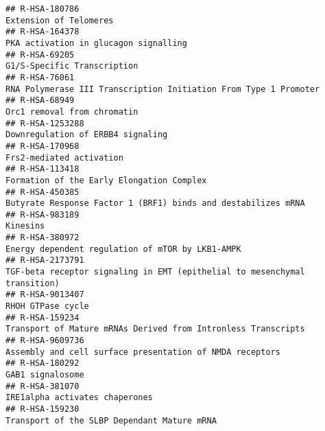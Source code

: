 \documentclass[
]{article}
\begin{document}
\begin{verbatim}
## R-HSA-180786                                                                                                                Extension of Telomeres
## R-HSA-164378                                                                                                 PKA activation in glucagon signalling
## R-HSA-69205                                                                                                            G1/S-Specific Transcription
## R-HSA-76061                                                                       RNA Polymerase III Transcription Initiation From Type 1 Promoter
## R-HSA-68949                                                                                                            Orc1 removal from chromatin
## R-HSA-1253288                                                                                                    Downregulation of ERBB4 signaling
## R-HSA-170968                                                                                                              Frs2-mediated activation
## R-HSA-113418                                                                                             Formation of the Early Elongation Complex
## R-HSA-450385                                                                         Butyrate Response Factor 1 (BRF1) binds and destabilizes mRNA
## R-HSA-983189                                                                                                                              Kinesins
## R-HSA-380972                                                                                      Energy dependent regulation of mTOR by LKB1-AMPK
## R-HSA-2173791                                                            TGF-beta receptor signaling in EMT (epithelial to mesenchymal transition)
## R-HSA-9013407                                                                                                                    RHOH GTPase cycle
## R-HSA-159234                                                                         Transport of Mature mRNAs Derived from Intronless Transcripts
## R-HSA-9609736                                                                             Assembly and cell surface presentation of NMDA receptors
## R-HSA-180292                                                                                                                      GAB1 signalosome
## R-HSA-381070                                                                                                        IRE1alpha activates chaperones
## R-HSA-159230                                                                                           Transport of the SLBP Dependant Mature mRNA

\end{verbatim}
\end{document}
